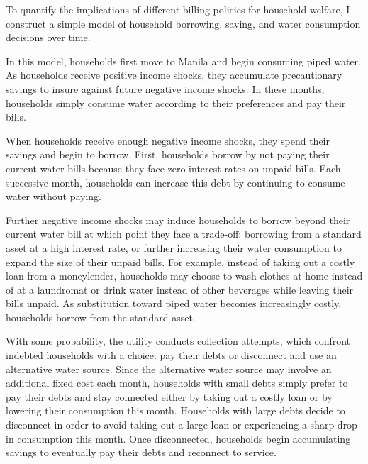 \documentclass[12pt]{article}
\begin{document}

To quantify the implications of different billing policies for household welfare, I construct a simple model of household borrowing, saving, and water consumption decisions over time.

In this model, households first move to Manila and begin consuming piped water.  As households receive positive income shocks, they accumulate precautionary savings to insure against future negative income shocks.  In these months, households simply consume water according to their preferences and pay their bills.

When households receive enough negative income shocks, they spend their savings and begin to borrow.  First, households borrow by not paying their current water bills because they face zero interest rates on unpaid bills.  Each successive month, households can increase this debt by continuing to consume water without paying.

Further negative income shocks may induce households to borrow beyond their current water bill at which point they face a trade-off: borrowing from a standard asset at a high interest rate, or further increasing their water consumption to expand the size of their unpaid bills.  For example, instead of taking out a costly loan from a moneylender, households may choose to wash clothes at home instead of at a laundromat or drink water instead of other beverages while leaving their bills unpaid.  As substitution toward piped water becomes increasingly costly, households borrow from the standard asset.

With some probability, the utility conducts collection attempts, which confront indebted households with a choice: pay their debts or disconnect and use an alternative water source.  Since the alternative water source may involve an additional fixed cost each month, households with small debts simply prefer to pay their debts and stay connected either by taking out a costly loan or by lowering their consumption this month.  Households with large debts decide to disconnect in order to avoid taking out a large loan or experiencing a sharp drop in consumption this month.  Once disconnected, households begin accumulating savings to eventually pay their debts and reconnect to service.
\end{document}

